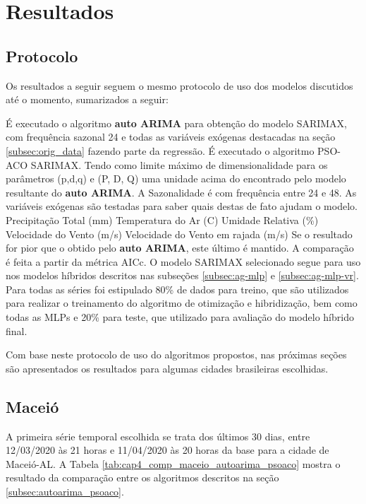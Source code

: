 \chapter{Resultados}
\label{cap:resultados}

\section{Protocolo}

Os resultados a seguir seguem o mesmo protocolo de uso dos modelos discutidos até o momento, sumarizados a seguir:

\begin{outline}[enumerate]
    \1 É executado o algoritmo \textbf{auto ARIMA} para obtenção do modelo SARIMAX, com frequência sazonal 24 e todas as variáveis exógenas destacadas na seção \ref{subsec:orig_data} fazendo parte da regressão.
    \1 É executado o algoritmo PSO-ACO SARIMAX.
        \2 Tendo como limite máximo de dimensionalidade para os parâmetros (p,d,q) e (P, D, Q) uma unidade acima do encontrado pelo modelo resultante do \textbf{auto ARIMA}.
        \2 A Sazonalidade é com frequência entre 24 e 48.
        \2 As variáveis exógenas são testadas para saber quais destas de fato ajudam o modelo.
            \3 Precipitação Total (mm)
            \3 Temperatura do Ar (\textdegree{}C)
            \3 Umidade Relativa (\%)
            \3 Velocidade do Vento (m/s)
            \3 Velocidade do Vento em rajada (m/s)
        \2 Se o resultado for pior que o obtido pelo \textbf{auto ARIMA}, este último é mantido. A comparação é feita a partir da métrica AICc.
    \1 O modelo SARIMAX selecionado segue para uso nos modelos híbridos descritos nas subseções \ref{subsec:ag-mlp} e \ref{subsec:ag-mlp-vr}.
        \2 Para todas as séries foi estipulado 80\% de dados para treino, que são utilizados para realizar o treinamento do algoritmo de otimização e hibridização, bem como todas as MLPs e 20\% para teste, que utilizado para avaliação do modelo híbrido final.
\end{outline}

Com base neste protocolo de uso do algoritmos propostos, nas próximas seções são apresentados os resultados para algumas cidades brasileiras escolhidas.

\section{Maceió}

A primeira série temporal escolhida se trata dos últimos 30 dias, entre 12/03/2020 às 21 horas e 11/04/2020 às 20 horas da base para a cidade de Maceió-AL. A Tabela \ref{tab:cap4_comp_maceio_autoarima_psoaco} mostra o resultado da comparação entre os algoritmos descritos na seção \ref{subsec:autoarima_psoaco}. 

